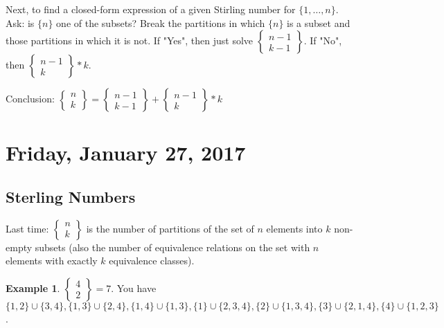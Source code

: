 \documentclass[12pt]{article}
\theoremstyle{definition}
\newtheorem{exmp}{Example}[section]
\begin{document}
Next, to find a closed-form expression of a given Stirling number for $\{1,
\ldots, n \}$. Ask: is $\{n \}$ one of the subsets? Break the partitions in
which $\{n\}$ is a subset and those partitions in which it is not. If "Yes",
then just solve $\begin{Bmatrix} n - 1 \\ k - 1\end{Bmatrix}$. If "No", then
$\begin{Bmatrix} n - 1 \\ k \end{Bmatrix} * k$.

Conclusion: $\begin{Bmatrix} n \\ k \end{Bmatrix} = \begin{Bmatrix} n - 1 \\ k
    - 1\end{Bmatrix} + \begin{Bmatrix} n - 1 \\ k \end{Bmatrix} * k$

\section{Friday, January 27, 2017}

\subsection{Sterling Numbers}

Last time: $\begin{Bmatrix}n \\ k\end{Bmatrix}$ is the number of partitions of
the set of $n$ elements into $k$ non-empty subsets (also the number of
equivalence relations on the set with $n$ elements with exactly $k$ equivalence
classes). 

\begin{exmp}
    $\begin{Bmatrix} 4 \\ 2 \end{Bmatrix} = 7$. You have $\{1, 2\} \cup \{3,
    4\}, \{1, 3\} \cup \{2, 4\}, \{1, 4\} \cup \{1, 3\}, \{1\} \cup \{2, 3, 4\},
    \{2\} \cup \{1, 3, 4\}, \{3\} \cup \{2, 1, 4\}, \{4\} \cup \{1, 2,3\}$.
\end{exmp}
\end{document}
